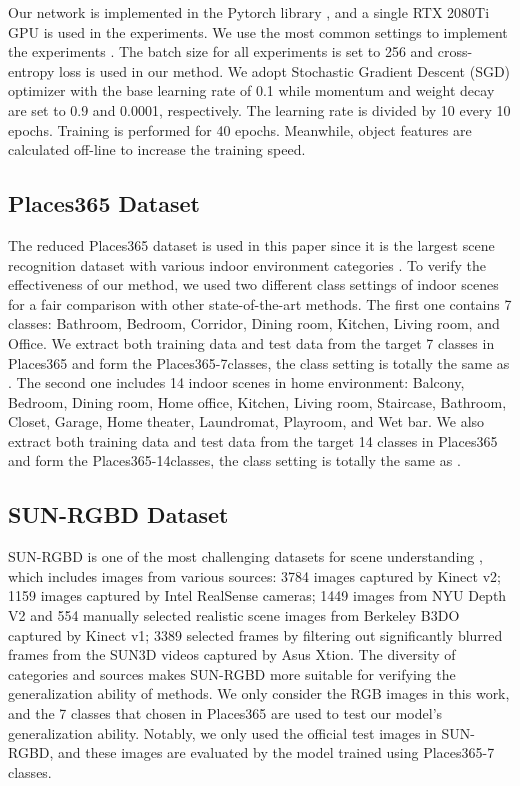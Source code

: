 \documentclass[letterpaper, 10 pt, conference]{ieeeconf}  %
\begin{document}
Our network is implemented in the Pytorch library \cite{Paszke2019}, and a single RTX 2080Ti GPU is used in the experiments. We use the most common settings to implement the experiments \cite{He2016}. The batch size for all experiments is set to 256 and cross-entropy loss is used in our method. We adopt Stochastic Gradient Descent (SGD) optimizer with the base learning rate of 0.1 while momentum and weight decay are set to 0.9 and 0.0001, respectively. The learning rate is divided by 10 every 10 epochs. Training is performed for 40 epochs. Meanwhile, object features are calculated off-line to increase the training speed.

\subsection{Places365 Dataset}
\label{Places365 Dataset}

The reduced Places365 dataset is used in this paper since it is the largest scene recognition dataset with various indoor environment categories \cite{zhou2017places}. To verify the effectiveness of our method, we used two different class settings of indoor scenes for a fair comparison with other state-of-the-art methods. The first one contains 7 classes: Bathroom, Bedroom, Corridor, Dining room, Kitchen, Living room, and Office. We extract both training data and test data from the target 7 classes in Places365 and form the Places365-7classes, the class setting is totally the same as \cite{pal2019deduce}. The second one includes 14 indoor scenes in home environment: Balcony, Bedroom, Dining room, Home office, Kitchen, Living room, Staircase, Bathroom, Closet, Garage, Home theater, Laundromat, Playroom, and Wet bar. We also extract both training data and test data from the target 14 classes in Places365 and form the Places365-14classes, the class setting is totally the same as \cite{Chen2018}.

\subsection{SUN-RGBD Dataset}
\label{SUN-RGBD Dataset}

SUN-RGBD is one of the most challenging datasets for scene understanding \cite{song2015sun}, which includes images from various sources: 3784 images captured by Kinect v2; 1159 images captured by Intel RealSense cameras; 1449 images from NYU Depth V2 \cite{Silberman2012indoor} and 554 manually selected realistic scene images from Berkeley B3DO \cite{janoch2013category} captured by Kinect v1; 3389 selected frames by filtering out significantly blurred frames from the SUN3D videos \cite{xiao2013sun3d} captured by Asus Xtion. The diversity of categories and sources makes SUN-RGBD more suitable for verifying the generalization ability of methods. We only consider the RGB images in this work, and the 7 classes that chosen in Places365 are used to test our model's generalization ability. Notably, we only used the official test images in SUN-RGBD, and these images are evaluated by the model trained using Places365-7 classes.
\end{document}

